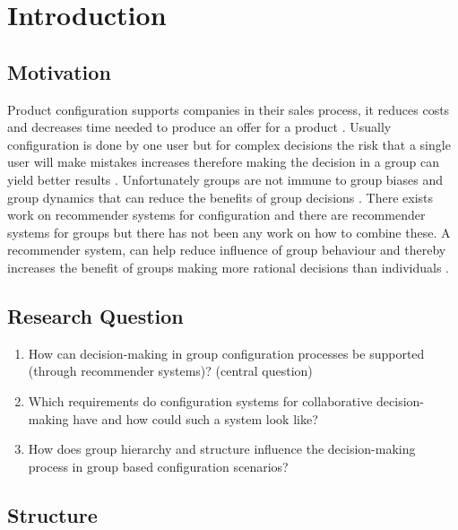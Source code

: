 \chapter{Introduction}
\label{ch:Introduction}

\section{Motivation}
\label{sec:Introduction:Motivation}

Product configuration supports companies in their sales process, it reduces costs and decreases time needed to produce an offer for a product \cite{shafieeCostBenefitAnalysis2018}. Usually configuration is done by one user but for complex decisions the risk that a single user will make mistakes increases therefore making the decision in a group can yield better results \cite{felferningGroupBasedConfiguration2016, felfernigGroupDecisionSupport2011}. Unfortunately groups are not immune to group biases and group dynamics that can reduce the benefits of group decisions \cite{kerrBiasJudgmentComparing1996}.
There exists work on recommender systems for configuration and there are recommender systems for groups but there has not been any work on how to combine these. A recommender system, can help reduce influence of group behaviour and thereby increases the benefit of groups making more rational decisions than individuals \cite{charnessGroupsMakeBetter2012}.

\section{Research Question}
\label{sec:Introduction:ResearchQuestion}
\begin{enumerate}
    \item How can decision-making in group configuration processes be supported (through recommender systems)? (central question)
    \item Which requirements do configuration systems for collaborative decision-making have and how could such a system look like?
    \item How does group hierarchy and structure influence the decision-making process in group based configuration scenarios?
\end{enumerate}

\section{Structure}
\label{sec:Introduction:Structure}
